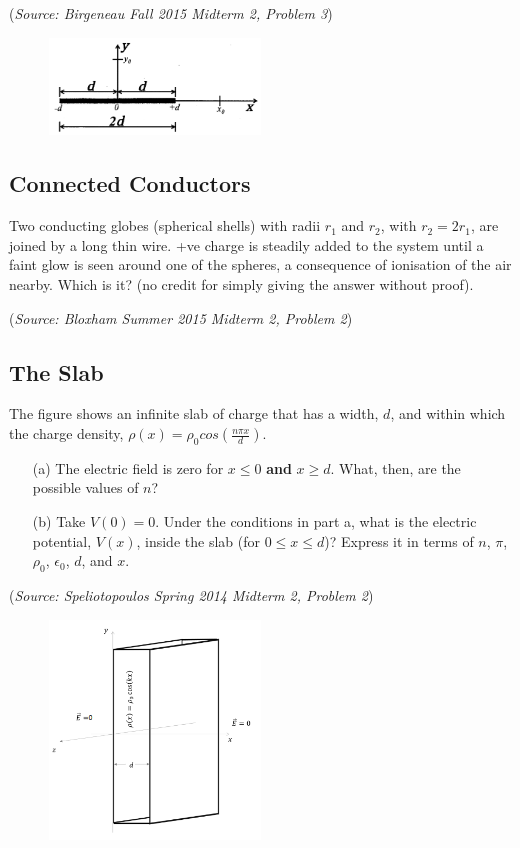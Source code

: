 \documentclass{article}
\begin{document}
(\textit{Source: Birgeneau Fall 2015 Midterm 2, Problem 3})

\begin{figure}[h]
	\begin{center}
	\includegraphics[width=0.5\textwidth]{RodMid.png}
	\end{center}
\end{figure}

\subsection{Connected Conductors}

Two conducting globes (spherical shells) with radii $r_1$ and $r_2$, with $r_2=2r_1$, are joined by a long thin wire. +ve charge is steadily added to the system until a faint glow is seen around one of the spheres, a consequence of ionisation of the air nearby. Which is it? (no credit for simply giving the answer without proof).

(\textit{Source: Bloxham Summer 2015 Midterm 2, Problem 2})

\subsection{The Slab}

The figure shows an infinite slab of charge that has a width, $d$, and within which the charge density, $\rho(x)=\rho_0cos\left(\frac{n\pi x}{d}\right)$.
\begin{itemize}
	\item[(a)] The electric field is zero for $x\leq0$ \textbf{and} $x\geq d$. What, then, are the possible values of $n$?
	\item[(b)] Take $V(0)=0$. Under the conditions in part a, what is the electric potential, $V(x)$, inside the slab (for $0\leq x\leq d$)? Express it in terms of $n$, $\pi$, $\rho_0$, $\epsilon_0$, $d$, and $x$.
\end{itemize}

(\textit{Source: Speliotopoulos Spring 2014 Midterm 2, Problem 2})

\begin{figure}[h]
	\begin{center}
	\includegraphics[width=0.5\textwidth]{SlabMid.png}
	\end{center}
\end{figure}
\end{document}
